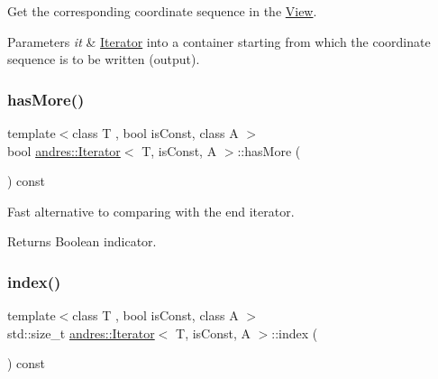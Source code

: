 Get the corresponding coordinate sequence in the \hyperlink{classandres_1_1View}{View}.


\begin{DoxyParams}{Parameters}
{\em it} & \hyperlink{classandres_1_1Iterator}{Iterator} into a container starting from which the coordinate sequence is to be written (output). \\
\hline
\end{DoxyParams}
\mbox{\label{classandres_1_1Iterator_a26f75a0ecde5e9b0512f07234ca2f39e}} 
\subsubsection{\texorpdfstring{has\+More()}{hasMore()}}
{\footnotesize\ttfamily template$<$class T , bool is\+Const, class A $>$ \\
bool \hyperlink{classandres_1_1Iterator}{andres\+::\+Iterator}$<$ T, is\+Const, A $>$\+::has\+More (\begin{DoxyParamCaption}{ }\end{DoxyParamCaption}) const\hspace{0.3cm}{\ttfamily [inline]}}

Fast alternative to comparing with the end iterator.

\begin{DoxyReturn}{Returns}
Boolean indicator. 
\end{DoxyReturn}
\mbox{\label{classandres_1_1Iterator_abf00924fc7110262606fdd9de01ebc2d}} 
\subsubsection{\texorpdfstring{index()}{index()}}
{\footnotesize\ttfamily template$<$class T , bool is\+Const, class A $>$ \\
std\+::size\+\_\+t \hyperlink{classandres_1_1Iterator}{andres\+::\+Iterator}$<$ T, is\+Const, A $>$\+::index (\begin{DoxyParamCaption}{ }\end{DoxyParamCaption}) const\hspace{0.3cm}{\ttfamily [inline]}}

